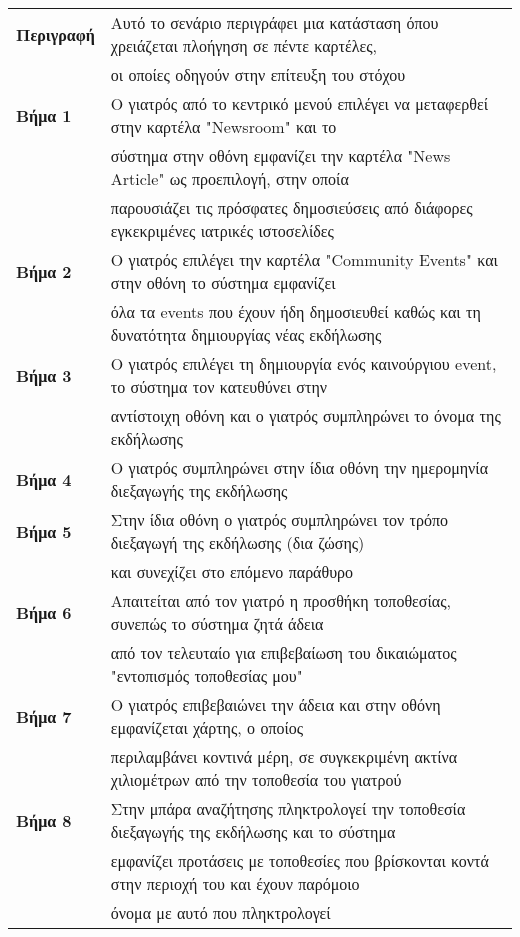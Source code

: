 \documentclass{article}
\newcommand\T{\rule{0pt}{2.6ex}}       %
\newcommand\B{\rule[-1.2ex]{0pt}{0pt}}
\begin{document}
 \begin{center}
     \begin{tabular}{|l|l|}
     \hline
      \textbf{Περιγραφή} & Αυτό το σενάριο περιγράφει μια κατάσταση όπου χρειάζεται πλοήγηση σε πέντε καρτέλες, \T \\& οι οποίες οδηγούν στην επίτευξη του στόχου \B \\ 
      \hline
      \textbf{Βήμα 1} & Ο γιατρός από το κεντρικό μενού επιλέγει να μεταφερθεί στην καρτέλα "Newsroom"  και το \T \\& σύστημα στην οθόνη εμφανίζει την καρτέλα "News Article" ως προεπιλογή, στην οποία  \\& παρουσιάζει τις πρόσφατες δημοσιεύσεις από διάφορες εγκεκριμένες ιατρικές ιστοσελίδες\B \\
      \hline
      \textbf{Βήμα 2} & Ο γιατρός επιλέγει την καρτέλα "Community Events" και στην οθόνη το σύστημα εμφανίζει \T \\& όλα τα events που έχουν ήδη δημοσιευθεί καθώς  και τη δυνατότητα δημιουργίας νέας εκδήλωσης\B \\
      \hline
      \textbf{Βήμα 3} & Ο γιατρός επιλέγει τη δημιουργία ενός καινούργιου event, το σύστημα τον κατευθύνει στην \T \\& αντίστοιχη οθόνη και ο γιατρός συμπληρώνει το όνομα της εκδήλωσης \B \\
      \hline
      \textbf{Βήμα 4} & Ο γιατρός συμπληρώνει στην ίδια οθόνη την ημερομηνία διεξαγωγής της εκδήλωσης \T\B \\
      \hline
      \textbf{Βήμα 5} & Στην ίδια οθόνη ο γιατρός συμπληρώνει τον τρόπο διεξαγωγή της εκδήλωσης (δια ζώσης) \T \\& και συνεχίζει στο επόμενο παράθυρο \B \\
      \hline
      \textbf{Βήμα 6} &  Απαιτείται από τον γιατρό η προσθήκη τοποθεσίας, συνεπώς το σύστημα ζητά άδεια \T \\& από τον τελευταίο για επιβεβαίωση του δικαιώματος "εντοπισμός τοποθεσίας μου" \B \\
      \hline
       \textbf{Βήμα 7} & Ο γιατρός επιβεβαιώνει την άδεια και στην οθόνη εμφανίζεται χάρτης, ο οποίος \T \\& περιλαμβάνει κοντινά μέρη, σε συγκεκριμένη ακτίνα χιλιομέτρων από την τοποθεσία του γιατρού \B \\
      \hline
       \textbf{Βήμα 8} & Στην μπάρα αναζήτησης πληκτρολογεί την τοποθεσία διεξαγωγής της εκδήλωσης και το σύστημα \T \\& εμφανίζει προτάσεις με τοποθεσίες που βρίσκονται κοντά στην περιοχή του και έχουν παρόμοιο \\& όνομα με αυτό που πληκτρολογεί \B \\

\end{tabular}
\end{center}
\end{document}
